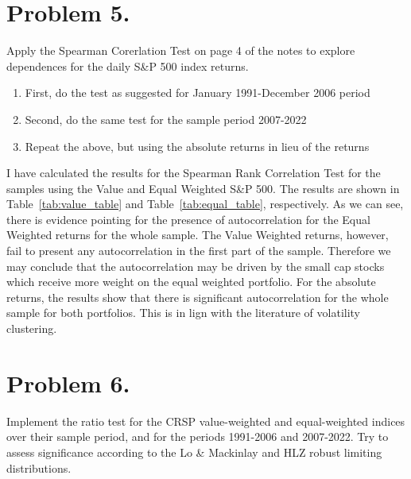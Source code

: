 \documentclass[12pt,twoside]{article}
\begin{document}
\newpage

\section{Problem 5.}
Apply the Spearman Corerlation Test on page 4 of the notes to explore dependences for the daily S\&P 500 index returns.

\begin{enumerate}[label = \alph*)]
    \item First, do the test as suggested for January 1991-December 2006 period
    \item Second, do the same test for the sample period 2007-2022
    \item Repeat the above, but using the absolute returns in lieu of the returns 
\end{enumerate}

\begin{solution}
    I have calculated the results for the Spearman Rank Correlation Test for the samples using the Value and Equal Weighted S\&P 500. The results are shown in Table~\ref{tab:value_table} and Table~\ref{tab:equal_table}, respectively. As we can see, there is evidence pointing for the presence of autocorrelation for the Equal Weighted returns for the whole sample. The Value Weighted returns, however, fail to present any autocorrelation in the first part of the sample. Therefore we may conclude that the autocorrelation may be driven by the small cap stocks which receive more weight on the equal weighted portfolio. For the absolute returns, the results show that there is significant autocorrelation for the whole sample for both portfolios. This is in lign with the literature of volatility clustering. \\
    
    
\end{solution}

\newpage

\section{Problem 6.}

Implement the \citet{lo1988stock} ratio test for the CRSP value-weighted and equal-weighted indices over their sample period, and for the periods 1991-2006 and 2007-2022. Try to assess significance according to the Lo \& Mackinlay and HLZ robust limiting distributions.
\end{document}
